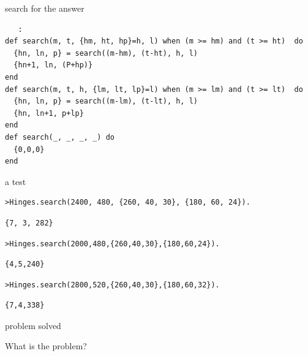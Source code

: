\begin{frame}[fragile]{search for the answer}

\begin{verbatim}
   :
def search(m, t, {hm, ht, hp}=h, l) when (m >= hm) and (t >= ht)  do
  {hn, ln, p} = search((m-hm), (t-ht), h, l)
  {hn+1, ln, (P+hp)}
end
def search(m, t, h, {lm, lt, lp}=l) when (m >= lm) and (t >= lt)  do
  {hn, ln, p} = search((m-lm), (t-lt), h, l)
  {hn, ln+1, p+lp}
end
def search(_, _, _, _) do
  {0,0,0}
end
\end{verbatim}
\end{frame}


\begin{frame}[fragile]{a test}

\begin{verbatim}
>Hinges.search(2400, 480, {260, 40, 30}, {180, 60, 24}).
\end{verbatim}
\pause
\begin{verbatim}
{7, 3, 282}
\end{verbatim}
\pause
\begin{verbatim}
>Hinges.search(2000,480,{260,40,30},{180,60,24}).
\end{verbatim}
\pause
\begin{verbatim}
{4,5,240}
\end{verbatim}
\begin{verbatim}
>Hinges.search(2800,520,{260,40,30},{180,60,32}).
\end{verbatim}
\pause
\begin{verbatim}
{7,4,338}
\end{verbatim}

\end{frame}

\begin{frame}{problem solved}

\pause
\vspace{40pt}\hspace{140pt}What is the problem?

\end{frame}

